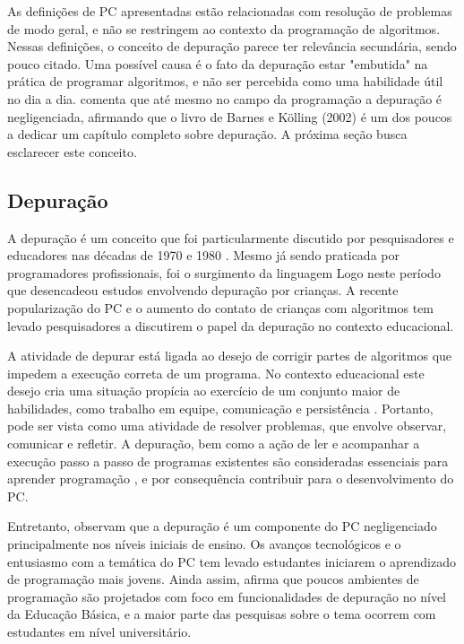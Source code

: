 As definições de PC apresentadas estão relacionadas com resolução de problemas de modo geral, e não se restringem ao contexto da programação de algoritmos. Nessas definições, o conceito de depuração parece ter relevância secundária, sendo pouco citado. Uma possível causa é o fato da depuração estar "embutida" na prática de programar algoritmos, e não ser percebida como uma habilidade útil no dia a dia.  comenta que até mesmo no campo da programação a depuração é negligenciada, afirmando que o livro de Barnes e Kölling (2002) é um dos poucos a dedicar um capítulo completo sobre depuração. A próxima seção busca esclarecer este conceito.

\subsection{Depuração}

A depuração é um conceito que foi particularmente discutido por pesquisadores e educadores nas décadas de 1970 \cite{mccauley_debugging_2008} e 1980 \cite{sipitakiat_robo-blocks_2012}. Mesmo já sendo praticada por programadores profissionais, foi o surgimento da linguagem Logo neste período que desencadeou estudos envolvendo depuração por crianças.  A recente popularização do PC e o aumento do contato de crianças com algoritmos tem levado pesquisadores a discutirem o papel da depuração no contexto educacional.

A atividade de depurar está ligada ao desejo de corrigir partes de algoritmos que impedem a execução correta de um programa. No contexto educacional este desejo cria uma situação propícia ao exercício de um conjunto maior de habilidades, como trabalho em equipe, comunicação e persistência \cite{spisipitakiat_robo-blocks_2012}. Portanto, pode ser vista como uma atividade de resolver problemas, que envolve observar, comunicar e refletir. A depuração, bem como a ação de ler e acompanhar a execução passo a passo de programas existentes são consideradas essenciais para aprender programação \cite{mccauley_debugging_2008}, e por consequência contribuir para o desenvolvimento do \ac{PC}.

Entretanto,  observam que a depuração é um componente do PC negligenciado principalmente nos níveis iniciais de ensino. Os avanços tecnológicos e o entusiasmo com a temática do PC tem levado estudantes iniciarem o aprendizado de programação mais jovens. Ainda assim, afirma que poucos ambientes de programação são projetados com foco em funcionalidades de depuração no nível da Educação Básica, e a maior parte das pesquisas sobre o tema ocorrem com estudantes em nível universitário. 

